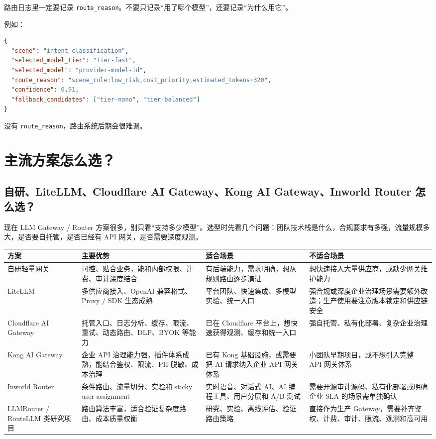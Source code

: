 \documentclass[10pt,a4paper]{ctexart}
\begin{document}
路由日志里一定要记录 \texttt{route\_reason}。不要只记录“用了哪个模型”，还要记录“为什么用它”。



例如：



\begin{lstlisting}[language=json]
{
  "scene": "intent_classification",
  "selected_model_tier": "tier-fast",
  "selected_model": "provider-model-id",
  "route_reason": "scene_rule:low_risk,cost_priority,estimated_tokens=320",
  "confidence": 0.91,
  "fallback_candidates": ["tier-nano", "tier-balanced"]
}
\end{lstlisting}



没有 \texttt{route\_reason}，路由系统后期会很难调。



\section{主流方案怎么选？}


\subsection{自研、LiteLLM、Cloudflare AI Gateway、Kong AI Gateway、Inworld Router 怎么选？}


现在 LLM Gateway / Router 方案很多，别只看“支持多少模型”。选型时先看几个问题：团队技术栈是什么，合规要求有多强，流量规模多大，是否要自托管，是否已经有 API 网关，是否需要深度观测。


{\footnotesize
\begin{tabularx}{\textwidth}{|X|X|X|X|}
\hline
\textbf{方案} & \textbf{主要优势} & \textbf{适合场景} & \textbf{不适合场景} \\
\hline
自研轻量网关 & 可控、贴合业务，能和内部权限、计费、审计深度结合 & 有后端能力，需求明确，想从规则路由逐步演进 & 想快速接入大量供应商，或缺少网关维护能力 \\
\hline
LiteLLM & 多供应商接入、OpenAI 兼容格式、Proxy / SDK 生态成熟 & 平台团队、快速集成、多模型实验、统一入口 & 强合规或深度企业治理场景需要额外改造；生产使用要注意版本锁定和供应链安全 \\
\hline
Cloudflare AI Gateway & 托管入口、日志分析、缓存、限流、重试、动态路由、DLP、BYOK 等能力 & 已在 Cloudflare 平台上，想快速获得观测、缓存和统一入口 & 强自托管、私有化部署、复杂企业治理 \\
\hline
Kong AI Gateway & 企业 API 治理能力强，插件体系成熟，能结合鉴权、限流、PII 脱敏、成本治理 & 已有 Kong 基础设施，或需要把 AI 请求纳入企业 API 网关体系 & 小团队早期项目，或不想引入完整 API 网关体系 \\
\hline
Inworld Router & 条件路由、流量切分、实验和 sticky user assignment & 实时语音、对话式 AI、AI 编程工具、用户分层和 A/B 测试 & 需要开源审计源码、私有化部署或明确企业 SLA 的场景需单独确认 \\
\hline
LLMRouter / RouteLLM 类研究项目 & 路由算法丰富，适合验证复杂度路由、成本质量权衡 & 研究、实验、离线评估、验证路由策略 & 直接作为生产 Gateway，需要补齐鉴权、计费、审计、限流、观测和高可用 \\
\hline
\end{tabularx}
}
\end{document}
